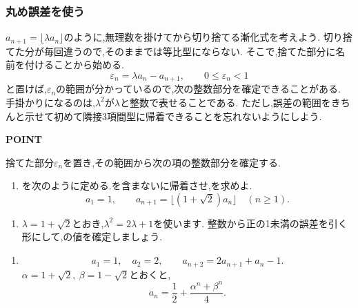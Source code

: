 \subsubsection{丸め誤差を使う}\label{節：丸め誤差を使う}
$a_{n+1}=\lfloor\lambda a_n\rfloor$のように,無理数を掛けてから切り捨てる漸化式を考えよう.
切り捨てた分が毎回違うので,そのままでは等比型にならない.
そこで,捨てた部分に名前を付けることから始める.
\[
  \varepsilon_n=\lambda a_n-a_{n+1},
  \qquad 0\le\varepsilon_n<1
\]
と置けば,$\varepsilon_n$の範囲が分かっているので,次の整数部分を確定できることがある.
手掛かりになるのは,$\lambda^2$が$\lambda$と整数で表せることである.
ただし,誤差の範囲をきちんと示せて初めて隣接3項間型に帰着できることを忘れないようにしよう.

\begin{bookpoint}
  \textbf{POINT}\par
  捨てた部分$\varepsilon_n$を置き,その範囲から次の項の整数部分を確定する.
\end{bookpoint}

\noindent {}\par\nobreak
\begin{enumerate}[label=(\arabic*),parsep=3pt,beginpenalty=10000,format=\bookitemlink{example-gauss-role-5}{problem}{hint}]
  \item {}を次のように定める.を含まないに帰着させ,を求めよ.
    \[
      a_1=1,\qquad
      a_{n+1}=\lfloor(1+\sqrt2)a_n\rfloor
      \quad(n\ge1).
    \]
\end{enumerate}

\noindent {}\par\nobreak
\begin{enumerate}[label=(\arabic*),parsep=3pt,beginpenalty=10000,format=\bookitemlink{example-gauss-role-5}{hint}{answer}]
  \item $\lambda=1+\sqrt2$とおき,$\lambda^2=2\lambda+1$を使います.
    整数から正の1未満の誤差を引く形にして,の値を確定しましょう.
\end{enumerate}

\noindent {}\par\nobreak
\begin{enumerate}[label=(\arabic*),parsep=3pt,beginpenalty=10000,format=\bookitemlink{example-gauss-role-5}{answer}{solution}]
  \item \[
      a_1=1,\quad a_2=2,\qquad
      a_{n+2}=2a_{n+1}+a_n-1.
    \]
    $\alpha=1+\sqrt2,\ \beta=1-\sqrt2$とおくと,
    \[
      a_n=\frac12+\frac{\alpha^n+\beta^n}{4}.
    \]
\end{enumerate}

